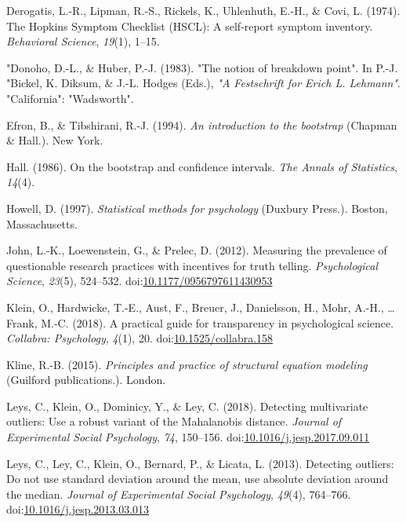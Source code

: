 \documentclass[man,floatsintext]{apa6}
\begin{document}
\leavevmode\hypertarget{ref-Derogatis_et_al_1974}{}%
Derogatis, L.-R., Lipman, R.-S., Rickels, K., Uhlenhuth, E.-H., \& Covi, L. (1974). The Hopkins Symptom Checklist (HSCL): A self‐report symptom inventory. \emph{Behavioral Science}, \emph{19}(1), 1--15.

\leavevmode\hypertarget{ref-Donoho_and_Huber_1983}{}%
"Donoho, D.-L., \& Huber, P.-J. (1983). "The notion of breakdown point". In P.-J. "Bickel, K. Diksum, \& J.-L. Hodges (Eds.), \emph{"A Festschrift for Erich L. Lehmann"}. "California": "Wadsworth".

\leavevmode\hypertarget{ref-Efron_Tibshirani_1994}{}%
Efron, B., \& Tibshirani, R.-J. (1994). \emph{An introduction to the bootstrap} (Chapman \& Hall.). New York.

\leavevmode\hypertarget{ref-Hall_1986}{}%
Hall. (1986). On the bootstrap and confidence intervals. \emph{The Annals of Statistics}, \emph{14}(4).

\leavevmode\hypertarget{ref-Howell_1997}{}%
Howell, D. (1997). \emph{Statistical methods for psychology} (Duxbury Press.). Boston, Massachusetts.

\leavevmode\hypertarget{ref-John_et_al_2012}{}%
John, L.-K., Loewenstein, G., \& Prelec, D. (2012). Measuring the prevalence of questionable research practices with incentives for truth telling. \emph{Psychological Science}, \emph{23}(5), 524--532. doi:\href{https://doi.org/10.1177/0956797611430953}{10.1177/0956797611430953}

\leavevmode\hypertarget{ref-Klein_et_al_2018}{}%
Klein, O., Hardwicke, T.-E., Aust, F., Breuer, J., Danielsson, H., Mohr, A.-H., \ldots{} Frank, M.-C. (2018). A practical guide for transparency in psychological science. \emph{Collabra: Psychology}, \emph{4}(1), 20. doi:\href{https://doi.org/10.1525/collabra.158}{10.1525/collabra.158}

\leavevmode\hypertarget{ref-Kline_2015}{}%
Kline, R.-B. (2015). \emph{Principles and practice of structural equation modeling} (Guilford publications.). London.

\leavevmode\hypertarget{ref-Leys_et_al_2018}{}%
Leys, C., Klein, O., Dominicy, Y., \& Ley, C. (2018). Detecting multivariate outliers: Use a robust variant of the Mahalanobis distance. \emph{Journal of Experimental Social Psychology}, \emph{74}, 150--156. doi:\href{https://doi.org/10.1016/j.jesp.2017.09.011}{10.1016/j.jesp.2017.09.011}

\leavevmode\hypertarget{ref-Leys_et_al_2013}{}%
Leys, C., Ley, C., Klein, O., Bernard, P., \& Licata, L. (2013). Detecting outliers: Do not use standard deviation around the mean, use absolute deviation around the median. \emph{Journal of Experimental Social Psychology}, \emph{49}(4), 764--766. doi:\href{https://doi.org/10.1016/j.jesp.2013.03.013}{10.1016/j.jesp.2013.03.013}
\end{document}
